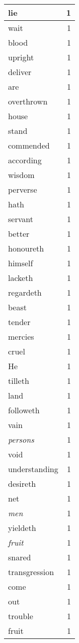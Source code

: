 \begin{center}
\begin{longtable}{l|r}
lie & 1\\ \hline 
wait & 1\\ \hline 
blood & 1\\ \hline 
upright & 1\\ \hline 
deliver & 1\\ \hline 
are & 1\\ \hline 
overthrown & 1\\ \hline 
house & 1\\ \hline 
stand & 1\\ \hline 
commended & 1\\ \hline 
according & 1\\ \hline 
wisdom & 1\\ \hline 
perverse & 1\\ \hline 
hath & 1\\ \hline 
servant & 1\\ \hline 
better & 1\\ \hline 
honoureth & 1\\ \hline 
himself & 1\\ \hline 
lacketh & 1\\ \hline 
regardeth & 1\\ \hline 
beast & 1\\ \hline 
tender & 1\\ \hline 
mercies & 1\\ \hline 
cruel & 1\\ \hline 
He & 1\\ \hline 
tilleth & 1\\ \hline 
land & 1\\ \hline 
followeth & 1\\ \hline 
vain & 1\\ \hline 
\emph{persons} & 1\\ \hline 
void & 1\\ \hline 
understanding & 1\\ \hline 
desireth & 1\\ \hline 
net & 1\\ \hline 
\emph{men} & 1\\ \hline 
yieldeth & 1\\ \hline 
\emph{fruit} & 1\\ \hline 
snared & 1\\ \hline 
transgression & 1\\ \hline 
come & 1\\ \hline 
out & 1\\ \hline 
trouble & 1\\ \hline 
fruit & 1\\ \hline 

\end{longtable}
\end{center}

